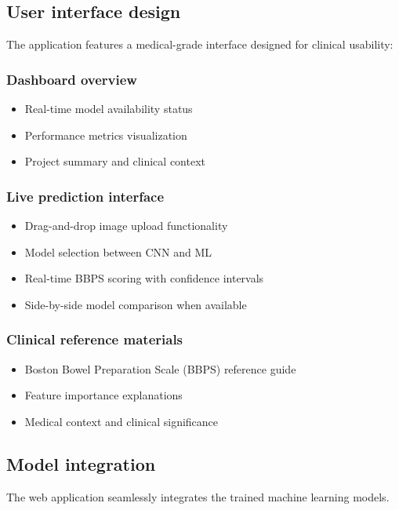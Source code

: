 \documentclass[11pt]{article}
\begin{document}
\subsection{User interface design}

The application features a medical-grade interface designed for clinical usability:

\subsubsection{Dashboard overview}
\begin{itemize}
    \item Real-time model availability status
    \item Performance metrics visualization
    \item Project summary and clinical context
\end{itemize}

\subsubsection{Live prediction interface}
\begin{itemize}
    \item Drag-and-drop image upload functionality
    \item Model selection between CNN and ML
    \item Real-time BBPS scoring with confidence intervals
    \item Side-by-side model comparison when available
\end{itemize}

\subsubsection{Clinical reference materials}
\begin{itemize}
    \item Boston Bowel Preparation Scale (BBPS) reference guide
    \item Feature importance explanations
    \item Medical context and clinical significance
\end{itemize}

\subsection{Model integration}

The web application seamlessly integrates the trained machine learning models.
\end{document}
